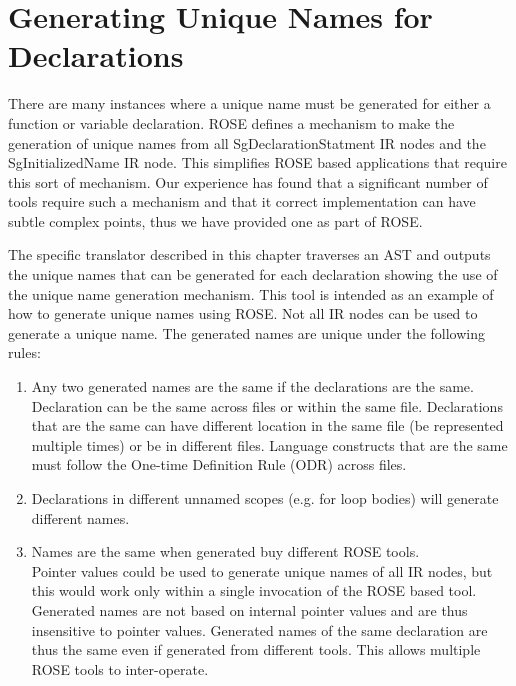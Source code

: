 \chapter{Generating Unique Names for Declarations}

     There are many instances where a unique name must be generated for
either a function or variable declaration.  ROSE defines a mechanism
to make the generation of unique names from all SgDeclarationStatment
IR nodes and the SgInitializedName IR node.  This simplifies ROSE based
applications that require this sort of mechanism.  Our experience has found
that a significant number of tools require such a mechanism and that it
correct implementation can have subtle complex points, thus we have provided
one as part of ROSE.

     The specific translator described in this chapter traverses an AST and outputs the
unique names that can be generated for each declaration showing the use of the 
unique name generation mechanism.  This tool is intended as an example of how to 
generate unique names using ROSE. Not all IR nodes can be used to generate a unique
name. The generated names are unique under the following rules:
\begin{enumerate}
   \item Any two generated names are the same if the declarations are the same. \\
   Declaration can be the same across files or within the same file.  Declarations that
   are the same can have different location in the same file (be represented multiple
   times) or be in different files. Language constructs that are the same must follow 
   the One-time Definition Rule (ODR) across files.
   \item Declarations in different unnamed scopes (e.g. for loop bodies) will generate 
   different names.
   \item Names are the same when generated buy different ROSE tools. \\
   Pointer values could be used to generate unique names of all IR nodes, but this would
   work only within a single invocation of the ROSE based tool.  Generated names are 
   not based on internal pointer values and are thus insensitive to pointer values.
   Generated names of the same declaration are thus the same even if generated from
   different tools.  This allows multiple ROSE tools to inter-operate.
\end{enumerate}

